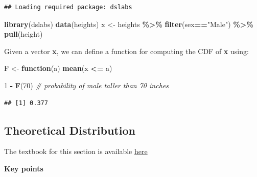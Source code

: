 \documentclass[
]{article}
\newenvironment{Shaded}{\begin{snugshade}}{\end{snugshade}}
\newcommand{\CommentTok}[1]{\textcolor[rgb]{0.56,0.35,0.01}{\textit{#1}}}
\newcommand{\ControlFlowTok}[1]{\textcolor[rgb]{0.13,0.29,0.53}{\textbf{#1}}}
\newcommand{\DecValTok}[1]{\textcolor[rgb]{0.00,0.00,0.81}{#1}}
\newcommand{\KeywordTok}[1]{\textcolor[rgb]{0.13,0.29,0.53}{\textbf{#1}}}
\newcommand{\NormalTok}[1]{#1}
\newcommand{\OperatorTok}[1]{\textcolor[rgb]{0.81,0.36,0.00}{\textbf{#1}}}
\newcommand{\StringTok}[1]{\textcolor[rgb]{0.31,0.60,0.02}{#1}}
\begin{document}
\begin{verbatim}
## Loading required package: dslabs
\end{verbatim}

\begin{Shaded}
\begin{Highlighting}[]
\KeywordTok{library}\NormalTok{(dslabs)}
\KeywordTok{data}\NormalTok{(heights)}
\NormalTok{x \textless{}{-}}\StringTok{ }\NormalTok{heights }\OperatorTok{\%\textgreater{}\%}\StringTok{ }\KeywordTok{filter}\NormalTok{(sex}\OperatorTok{==}\StringTok{"Male"}\NormalTok{) }\OperatorTok{\%\textgreater{}\%}\StringTok{ }\KeywordTok{pull}\NormalTok{(height)}
\end{Highlighting}
\end{Shaded}

Given a vector \textbf{x}, we can define a function for computing the
CDF of \textbf{x} using:

\begin{Shaded}
\begin{Highlighting}[]
\NormalTok{F \textless{}{-}}\StringTok{ }\ControlFlowTok{function}\NormalTok{(a) }\KeywordTok{mean}\NormalTok{(x }\OperatorTok{\textless{}=}\StringTok{ }\NormalTok{a)}

\DecValTok{1} \OperatorTok{{-}}\StringTok{ }\KeywordTok{F}\NormalTok{(}\DecValTok{70}\NormalTok{)    }\CommentTok{\# probability of male taller than 70 inches}
\end{Highlighting}
\end{Shaded}

\begin{verbatim}
## [1] 0.377
\end{verbatim}

\hypertarget{theoretical-distribution}{%
\subsection{Theoretical Distribution}\label{theoretical-distribution}}

The textbook for this section is available
\href{https://rafalab.github.io/dsbook/probability.html\#theoretical-continuous-distributions}{here}

\textbf{Key points}
\end{document}

